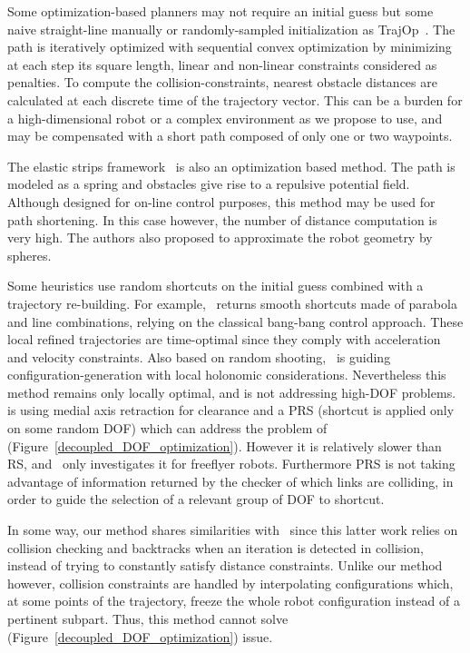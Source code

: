 \documentclass{tADR2e}
\begin{document}
Some optimization-based planners may not require an initial guess but some naive 
straight-line manually or randomly-sampled initialization as 
TrajOp~\cite{SchulmanConvexOptim}. The path is iteratively optimized with 
sequential convex optimization by minimizing at each step its square length, 
linear and non-linear constraints considered as penalties. To compute the 
collision-constraints, nearest obstacle distances are calculated at each discrete 
time of the trajectory vector. This can be a burden for a high-dimensional robot 
or a complex environment as we propose to use, and may be compensated with a 
short path composed of only one or two waypoints.


The elastic strips framework~\cite{BrockElasticStrips} is also an optimization 
based method. The path is modeled as a spring and obstacles give rise to a 
repulsive potential field. Although designed for on-line control purposes, this 
method may be used for path shortening. In this case however, the number of 
distance computation is very high. The authors also proposed to approximate the 
robot geometry by spheres.

Some heuristics use random shortcuts on the initial guess combined with a 
trajectory re-building. For example,~\cite{HauserFastSmooth} returns smooth shortcuts made of parabola and line combinations, relying on the classical bang-bang control approach. These local refined trajectories 
are time-optimal since they comply with acceleration and velocity constraints. 
Also based on random shooting,~\cite{Guernane2011} is guiding 
configuration-generation with local holonomic considerations. 
Nevertheless this method remains only 
locally optimal, and is not addressing high-DOF 
problems.~\cite{Geraerts04clearancebased} is 
using medial axis retraction for clearance and a PRS (shortcut is applied only 
on some random DOF) 
which can address the problem of (Figure~\ref{decoupled_DOF_optimization}). 
However it is 
relatively slower than RS, and~\cite{Geraerts04clearancebased} only investigates 
it for freeflyer robots. 
Furthermore PRS is not taking advantage of information returned by 
the checker of which links are colliding, in order to guide the selection of a relevant group of DOF to shortcut.

In some way, our method shares similarities with~\cite{PanSmoothSplineShort} 
since this latter work relies on collision checking and backtracks when an 
iteration is detected in collision, instead of trying to constantly satisfy 
distance constraints. Unlike our method however, collision constraints are 
handled by interpolating configurations which, at some points of the trajectory, 
freeze the whole robot configuration instead of a pertinent subpart. Thus, this 
method cannot solve (Figure~\ref{decoupled_DOF_optimization}) issue.
\end{document}
